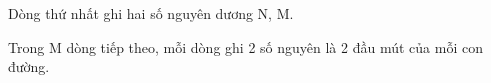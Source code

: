 Dòng thứ nhất ghi hai số nguyên dương N, M.  

   Trong M dòng tiếp theo, mỗi dòng ghi 2 số nguyên là 2 đầu mút của mỗi con đường.  

\